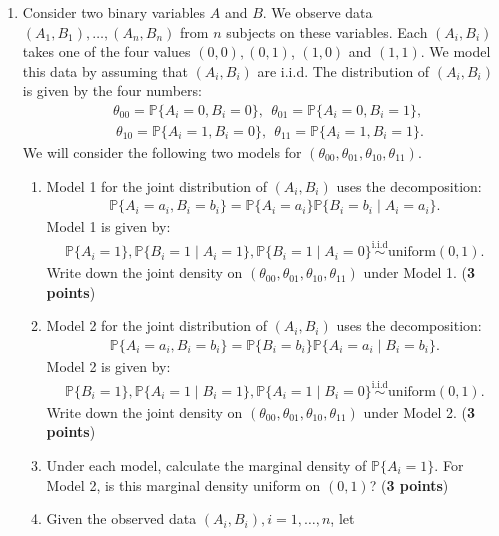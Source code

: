 \documentclass{scrartcl}
\renewcommand{\P}{{\mathbb P}}
\begin{document}
\begin{enumerate}
\item Consider two binary variables $A$ and $B$. We observe data
  $(A_1, B_1), \dots, (A_n, B_n)$ from $n$ subjects on these
  variables. Each $(A_i, B_i)$ takes one of the four values $(0, 0),
  (0, 1)$, $(1, 0)$ and $(1, 1)$. We model this data by assuming that
  $(A_i, B_i)$ are i.i.d. The distribution of $(A_i, B_i)$ is given by
  the four numbers:
  \begin{align*}
&  \theta_{00} = \P\{A_i = 0, B_i = 0\}, ~~ \theta_{01} = \P\{A_i = 0,
  B_i = 1\}, \\
&~ \theta_{10} = \P\{A_i = 1, B_i = 0\}, ~~ \theta_{11} = \P\{A_i = 1,
  B_i = 1\}. 
  \end{align*}
We will consider the following two models for $(\theta_{00},
\theta_{01}, \theta_{10}, \theta_{11})$. 
  \begin{enumerate}
  \item Model 1 for the joint distribution of $(A_i, B_i)$ uses the
    decomposition:
    \begin{align*}
      \P\{A_i = a_i, B_i = b_i\} = \P\{A_i = a_i\} \P\{B_i = b_i \mid
      A_i = a_i\}.
    \end{align*}
    Model 1 is given by:
    \begin{align*}
      \P\{A_i = 1\}, \P\{B_i = 1 \mid A_i = 1\}, \P\{B_i = 1 \mid A_i
      = 0\} \overset{\text{i.i.d}}{\sim} \text{uniform}(0, 1). 
    \end{align*}
    Write down the joint density on $(\theta_{00}, \theta_{01},
    \theta_{10}, \theta_{11})$ under Model 1. (\textbf{3 points})
  \item Model 2 for the joint distribution of $(A_i, B_i)$ uses the
    decomposition:
    \begin{align*}
      \P\{A_i = a_i, B_i = b_i\} = \P\{B_i = b_i\} \P\{A_i = a_i \mid
      B_i = b_i\}.
    \end{align*}
    Model 2 is given by:
    \begin{align*}
      \P\{B_i = 1\}, \P\{A_i = 1 \mid B_i = 1\}, \P\{A_i = 1 \mid B_i
      = 0\} \overset{\text{i.i.d}}{\sim} \text{uniform}(0, 1). 
    \end{align*}
    Write down the joint density on $(\theta_{00}, \theta_{01},
    \theta_{10}, \theta_{11})$ under Model 2. (\textbf{3 points})
  \item Under each model, calculate the marginal density of $\P\{A_i =
    1\}$. For Model 2, is this marginal density uniform on $(0, 1)$?
    (\textbf{3 points})
  \item Given the observed data $(A_i, B_i), i = 1, \dots, n$, let

\end{enumerate}
\end{enumerate}
\end{document}
